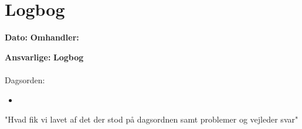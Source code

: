 \chapter{Logbog}

\textbf{Dato:} 
\textbf{Omhandler:} 

\textbf{Ansvarlige:} 
\textbf{Logbog}
\\
\\
Dagsorden:
\begin{itemize}
	\item 
\end{itemize}


"Hvad fik vi lavet af det der stod på dagsordnen samt problemer og vejleder svar"